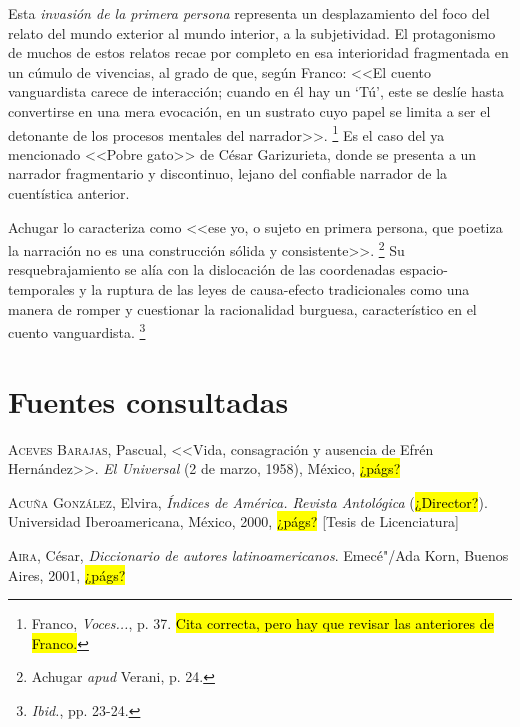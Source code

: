 \documentclass[14pt,twoside,final]{extbook} %
\let\oldfootnote\footnote
\renewcommand\footnote[1]{%
\oldfootnote{\hspace{1mm}#1}}
\begin{document}
Esta \emph{invasión de la primera persona} representa un desplazamiento del foco del relato del mundo exterior al mundo interior, a la subjetividad. El protagonismo de muchos de estos relatos recae por completo en esa interioridad fragmentada en un cúmulo de vivencias, al grado de que, según Franco: <<El cuento vanguardista carece
de interacción; cuando en él hay un `Tú', este se deslíe hasta convertirse en una
mera evocación, en un sustrato cuyo papel se limita a ser el detonante de los
procesos mentales del narrador>>.\footnote{Franco, \emph{Voces...}, p. 37. \hl{Cita correcta, pero hay que revisar las anteriores de Franco.}} Es el caso del ya mencionado <<Pobre gato>> de César Garizurieta, donde se presenta a un narrador fragmentario y discontinuo, lejano del confiable narrador de la cuentística anterior.

Achugar lo caracteriza como <<ese yo, o sujeto en primera persona, que poetiza la narración no es una construcción sólida y consistente>>.\footnote{Achugar \emph{apud} Verani, p. 24.} Su resquebrajamiento se alía con la dislocación de las coordenadas espacio-temporales y la ruptura de las leyes de causa-efecto tradicionales como una manera de romper y cuestionar la racionalidad burguesa, característico en el cuento vanguardista.\footnote{\emph{Ibid.}, pp. 23-24.}
\chapter*{Fuentes consultadas}\label{ch:fuentes-consultadas}
\thispagestyle{empty}
\pagestyle{fancy}
\fancyhf{} %
\fancyhead[RO,LE]{\textlf{\thepage}}
\renewcommand{\headrulewidth}{0pt}
\setcounter{page}{37}
\textsc{Aceves Barajas}, Pascual, <<Vida, consagración y ausencia de Efrén Hernández>>. \emph{El Universal} (2 de marzo, 1958), México, \hl{¿págs?} \label{bib:aceves1958}

\textsc{Acuña González}, Elvira, \emph{Índices de \emph{América}. Revista Antológica} (\hl{¿Director?}). Universidad Iberoamericana, México, 2000, \hl{¿págs?} [Tesis de Licenciatura]\label{bib:acuña2000}

\textsc{Aira}, César, \emph{Diccionario de autores latinoamericanos}. Emecé"/Ada Korn, Buenos Aires, 2001, \hl{¿págs?}\label{bib:aira2001}
\end{document}
